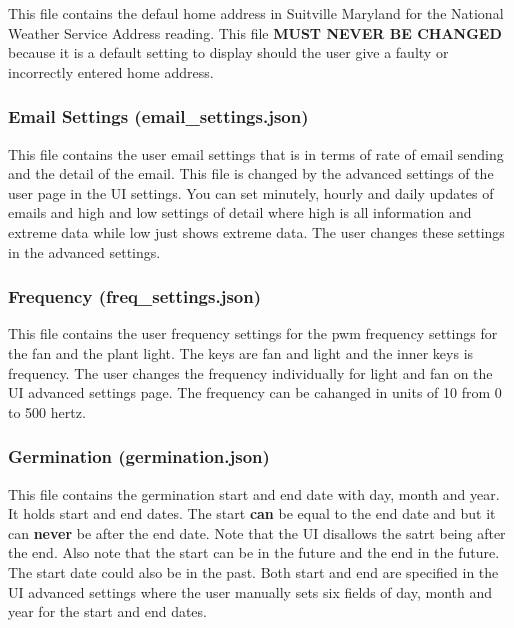 \documentclass[
]{article}
\begin{document}
This file contains the defaul home address in Suitville Maryland for the
National Weather Service Address reading. This file \textbf{MUST NEVER
BE CHANGED} because it is a default setting to display should the user
give a faulty or incorrectly entered home address.

\hypertarget{email-settings-email_settings.json}{%
\subsubsection{Email Settings
(email\_settings.json)}\label{email-settings-email_settings.json}}

This file contains the user email settings that is in terms of rate of
email sending and the detail of the email. This file is changed by the
advanced settings of the user page in the UI settings. You can set
minutely, hourly and daily updates of emails and high and low settings
of detail where high is all information and extreme data while low just
shows extreme data. The user changes these settings in the advanced
settings.

\hypertarget{frequency-freq_settings.json}{%
\subsubsection{Frequency
(freq\_settings.json)}\label{frequency-freq_settings.json}}

This file contains the user frequency settings for the pwm frequency
settings for the fan and the plant light. The keys are fan and light and
the inner keys is frequency. The user changes the frequency individually
for light and fan on the UI advanced settings page. The frequency can be
cahanged in units of 10 from 0 to 500 hertz.

\hypertarget{germination-germination.json}{%
\subsubsection{Germination
(germination.json)}\label{germination-germination.json}}

This file contains the germination start and end date with day, month
and year. It holds start and end dates. The start \textbf{can} be equal
to the end date and but it can \textbf{never} be after the end date.
Note that the UI disallows the satrt being after the end. Also note that
the start can be in the future and the end in the future. The start date
could also be in the past. Both start and end are specified in the UI
advanced settings where the user manually sets six fields of day, month
and year for the start and end dates.
\end{document}
